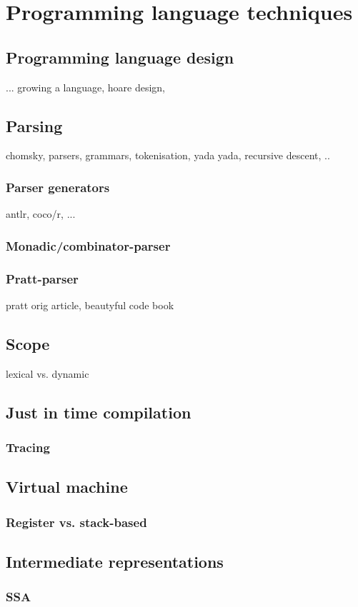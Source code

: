 \section{Programming language techniques}
\subsection{Programming language design}
... growing a language, hoare design,
\subsection{Parsing}
chomsky, parsers, grammars, tokenisation, yada yada, recursive descent, ..
\subsubsection{Parser generators}
antlr, coco/r, ...
\subsubsection{Monadic/combinator-parser}
\subsubsection{Pratt-parser}
pratt orig article, beautyful code book
\subsection{Scope}
lexical vs. dynamic
\subsection{Just in time compilation}
\subsubsection{Tracing}
\subsection{Virtual machine}
\subsubsection{Register vs. stack-based}
\subsection{Intermediate representations}
\subsubsection{SSA}
